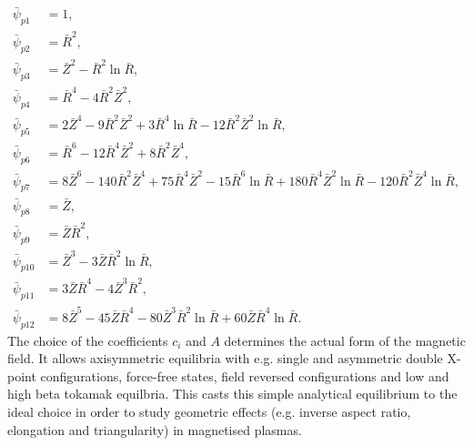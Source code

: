 \documentclass{hitec} %
\begin{document}
\begin{align}
  \bar{\psi}_{p1} &= 1,
  \nonumber \\
  \bar{\psi}_{p2} &= \bar{R}^2, \nonumber\\
  \bar{\psi}_{p3} &= \bar{Z}^2 - \bar{R}^2 \ln{\bar{R}},\nonumber\\
  \bar{\psi}_{p4} &= \bar{R}^4 -4\bar{R}^2\bar{Z}^2,\nonumber\\
  \bar{\psi}_{p5} &= 2\bar{Z}^4 - 9 \bar{R}^2\bar{Z}^2 +
                     3 \bar{R}^4 \ln{\bar{R}} 
                    -12  \bar{R}^2\bar{Z}^2 \ln{\bar{R}},
  \nonumber \\
\bar{\psi}_{p6} &= \bar{R}^6 -12 \bar{R}^4 \bar{Z}^2 
                     + 8  \bar{R}^2 \bar{Z}^4,\nonumber\\
 \bar{\psi}_{p7} &=  8\bar{Z}^6 -140 \bar{R}^2 \bar{Z}^4
                      + 75 \bar{R}^4 \bar{Z}^2 - 15\bar{R}^6\ln{\bar{R}}+ 180 \bar{R}^4 \bar{Z}^2 \ln{\bar{R}}
                       -120 \bar{R}^2 \bar{Z}^4 \ln{\bar{R}},\nonumber\\
  \bar{\psi}_{p8} &= \bar{Z},\nonumber \\
  \bar{\psi}_{p9} &=  \bar{Z}  \bar{R}^2,\nonumber\\
  \bar{\psi}_{p10} &=  \bar{Z}^3 - 3 \bar{Z} \bar{R}^2 \ln{\bar{R}},\nonumber\\
  \bar{\psi}_{p11} &= 3 \bar{Z}\bar{R}^4 - 4\bar{Z}^3\bar{R}^2,\nonumber\\
  \bar{\psi}_{p12} &=  8 \bar{Z}^5 -45 \bar{Z} \bar{R}^4 -
                       80 \bar{Z}^3 \bar{R}^2\ln{\bar{R}} 
                       +60 \bar{Z} \bar{R}^4\ln{\bar{R}} .\nonumber
\end{align}
The choice of the coefficients \(c_{i}\) and \(A\) determines the actual form of the magnetic field. It allows axisymmetric equilibria with e.g. single and asymmetric double X-point configurations, force-free states, 
field reversed configurations and low and high beta tokamak equilbria. This casts this simple analytical equilibrium to the ideal choice in order to study geometric effects (e.g. inverse aspect ratio, elongation and triangularity) in magnetised plasmas.
\end{document}
